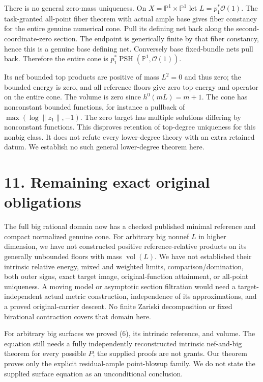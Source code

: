 \documentclass[
  10pt,
]{article}
\begin{document}
There is no general zero-mass uniqueness. On
\(X=\mathbb P^1\times\mathbb P^1\) let \(L=p_1^*\mathcal O(1)\). The
task-granted all-point fiber theorem with actual ample base gives fiber
constancy for the entire genuine numerical cone. Pull its defining net
back along the second-coordinate-zero section. The endpoint is
generically finite by that fiber constancy, hence this is a genuine base
defining net. Conversely base fixed-bundle nets pull back. Therefore the
entire cone is \(p_1^*\operatorname{PSH}(\mathbb P^1,\mathcal O(1))\).

Its nef bounded top products are positive of mass \(L^2=0\) and thus
zero; the bounded energy is zero, and all reference floors give zero top
energy and operator on the entire cone. The volume is zero since
\(h^0(mL)=m+1\). The cone has nonconstant bounded functions, for
instance a pullback of \(\max(\log\|z_1\|,-1)\). The zero target has
multiple solutions differing by nonconstant functions. This disproves
retention of top-degree uniqueness for this nonbig class. It does not
refute every lower-degree theory with an extra retained datum. We
establish no such general lower-degree theorem here.

\section{11. Remaining exact original
obligations}\label{remaining-exact-original-obligations}

The full big rational domain now has a checked published minimal
reference and compact normalized genuine cone. For arbitrary big nonnef
\(L\) in higher dimension, we have not constructed positive
reference-relative products on its generally unbounded floors with mass
\(\operatorname{vol}(L)\). We have not established their intrinsic
relative energy, mixed and weighted limits, comparison/domination, both
outer signs, exact target image, original-function attainment, or
all-point uniqueness. A moving model or asymptotic section filtration
would need a target-independent actual metric construction, independence
of its approximations, and a proved original-carrier descent. No finite
Zariski decomposition or fixed birational contraction covers that domain
here.

For arbitrary big surfaces we proved (6), its intrinsic reference, and
volume. The equation still needs a fully independently reconstructed
intrinsic nef-and-big theorem for every possible \(P\); the supplied
proofs are not grants. Our theorem proves only the explicit
residual-ample point-blowup family. We do not state the supplied surface
equation as an unconditional conclusion.
\end{document}
